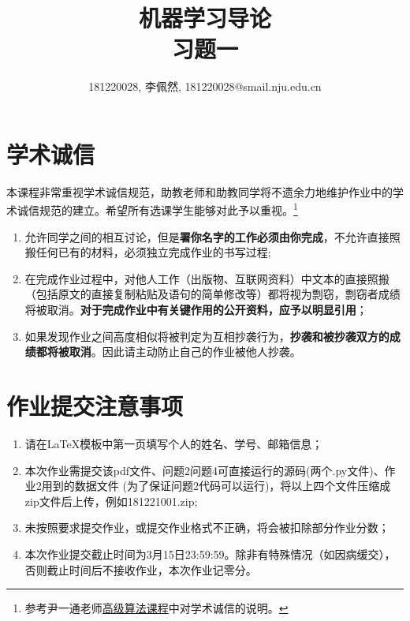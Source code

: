 \documentclass[a4paper,UTF8]{article}
\theoremstyle{definition}
\begin{document}
\title{机器学习导论\\习题一}
\author{181220028, 李佩然, 181220028@smail.nju.edu.cn}
\maketitle


\section*{学术诚信}

本课程非常重视学术诚信规范，助教老师和助教同学将不遗余力地维护作业中的学术诚信规范的建立。希望所有选课学生能够对此予以重视。\footnote{参考尹一通老师\href{http://tcs.nju.edu.cn/wiki/}{高级算法课程}中对学术诚信的说明。}

\begin{tcolorbox}
	\begin{enumerate}
		\item[(1)] 允许同学之间的相互讨论，但是{\color{red}\textbf{署你名字的工作必须由你完成}}，不允许直接照搬任何已有的材料，必须独立完成作业的书写过程;
		\item[(2)] 在完成作业过程中，对他人工作（出版物、互联网资料）中文本的直接照搬（包括原文的直接复制粘贴及语句的简单修改等）都将视为剽窃，剽窃者成绩将被取消。{\color{red}\textbf{对于完成作业中有关键作用的公开资料，应予以明显引用}}；
		\item[(3)] 如果发现作业之间高度相似将被判定为互相抄袭行为，{\color{red}\textbf{抄袭和被抄袭双方的成绩都将被取消}}。因此请主动防止自己的作业被他人抄袭。
	\end{enumerate}
\end{tcolorbox}

\section*{作业提交注意事项}
\begin{tcolorbox}
	\begin{enumerate}
		\item[(1)] 请在LaTeX模板中第一页填写个人的姓名、学号、邮箱信息；
		\item[(2)] 本次作业需提交该pdf文件、问题2问题4可直接运行的源码(两个.py文件)、作业2用到的数据文件 (为了保证问题2代码可以运行)，将以上四个文件压缩成zip文件后上传，例如181221001.zip;
		\item[(3)] 未按照要求提交作业，或提交作业格式不正确，将会被扣除部分作业分数；
		\item[(4)] 本次作业提交截止时间为3月15日23:59:59。除非有特殊情况（如因病缓交），否则截止时间后不接收作业，本次作业记零分。
	\end{enumerate}
\end{tcolorbox}
\end{document}

